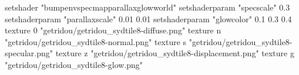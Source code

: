 setshader "bumpenvspecmapparallaxglowworld"
setshaderparam "specscale" 0.3
setshaderparam "parallaxscale" 0.01 0.01
setshaderparam "glowcolor" 0.1 0.3 0.4
texture 0 "getridou/getridou_sydtile8-diffuse.png"
texture n "getridou/getridou_sydtile8-normal.png"
texture s "getridou/getridou_sydtile8-specular.png"
texture z "getridou/getridou_sydtile8-displacement.png"
texture g "getridou/getridou_sydtile8-glow.png"
